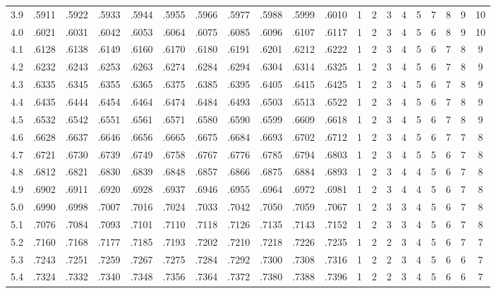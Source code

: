 {\begin{tabular}{|c|cccccccccc|ccccccccc|}
3.9 & .5911 & .5922 & .5933 & .5944 & .5955 & .5966 & .5977 & .5988 & .5999 & .6010 & 1 & 2 & 3 & 4 & 5 & 7 & 8 & 9 & 10 \\
4.0 & .6021 & .6031 & .6042 & .6053 & .6064 & .6075 & .6085 & .6096 & .6107 & .6117 & 1 & 2 & 3 & 4 & 5 & 6 & 8 & 9 & 10 \\
4.1 & .6128 & .6138 & .6149 & .6160 & .6170 & .6180 & .6191 & .6201 & .6212 & .6222 & 1 & 2 & 3 & 4 & 5 & 6 & 7 & 8 & 9 \\
4.2 & .6232 & .6243 & .6253 & .6263 & .6274 & .6284 & .6294 & .6304 & .6314 & .6325 & 1 & 2 & 3 & 4 & 5 & 6 & 7 & 8 & 9 \\
4.3 & .6335 & .6345 & .6355 & .6365 & .6375 & .6385 & .6395 & .6405 & .6415 & .6425 & 1 & 2 & 3 & 4 & 5 & 6 & 7 & 8 & 9 \\
4.4 & .6435 & .6444 & .6454 & .6464 & .6474 & .6484 & .6493 & .6503 & .6513 & .6522 & 1 & 2 & 3 & 4 & 5 & 6 & 7 & 8 & 9 \\
4.5 & .6532 & .6542 & .6551 & .6561 & .6571 & .6580 & .6590 & .6599 & .6609 & .6618 & 1 & 2 & 3 & 4 & 5 & 6 & 7 & 8 & 9 \\
4.6 & .6628 & .6637 & .6646 & .6656 & .6665 & .6675 & .6684 & .6693 & .6702 & .6712 & 1 & 2 & 3 & 4 & 5 & 6 & 7 & 7 & 8 \\
4.7 & .6721 & .6730 & .6739 & .6749 & .6758 & .6767 & .6776 & .6785 & .6794 & .6803 & 1 & 2 & 3 & 4 & 5 & 5 & 6 & 7 & 8 \\
4.8 & .6812 & .6821 & .6830 & .6839 & .6848 & .6857 & .6866 & .6875 & .6884 & .6893 & 1 & 2 & 3 & 4 & 4 & 5 & 6 & 7 & 8 \\
4.9 & .6902 & .6911 & .6920 & .6928 & .6937 & .6946 & .6955 & .6964 & .6972 & .6981 & 1 & 2 & 3 & 4 & 4 & 5 & 6 & 7 & 8 \\
5.0 & .6990 & .6998 & .7007 & .7016 & .7024 & .7033 & .7042 & .7050 & .7059 & .7067 & 1 & 2 & 3 & 3 & 4 & 5 & 6 & 7 & 8 \\
5.1 & .7076 & .7084 & .7093 & .7101 & .7110 & .7118 & .7126 & .7135 & .7143 & .7152 & 1 & 2 & 3 & 3 & 4 & 5 & 6 & 7 & 8 \\
5.2 & .7160 & .7168 & .7177 & .7185 & .7193 & .7202 & .7210 & .7218 & .7226 & .7235 & 1 & 2 & 2 & 3 & 4 & 5 & 6 & 7 & 7 \\
5.3 & .7243 & .7251 & .7259 & .7267 & .7275 & .7284 & .7292 & .7300 & .7308 & .7316 & 1 & 2 & 2 & 3 & 4 & 5 & 6 & 6 & 7 \\
5.4 & .7324 & .7332 & .7340 & .7348 & .7356 & .7364 & .7372 & .7380 & .7388 & .7396 & 1 & 2 & 2 & 3 & 4 & 5 & 6 & 6 & 7 \\
\hline
\end{tabular}\par}

